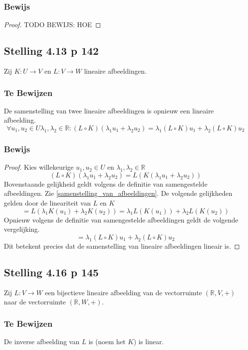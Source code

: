 \documentclass[lineaire_algebra_oplossingen.tex]{subfiles}
\begin{document}
\subsubsection*{Bewijs}
\begin{proof}
TODO BEWIJS: HOE
\end{proof}

\subsection{Stelling 4.13 p 142}
Zij $K:U\rightarrow V$ en $L:V\rightarrow W$ lineaire afbeeldingen.
\subsubsection*{Te Bewijzen}
De samenstelling van twee lineaire afbeeldingen is opnieuw een lineaire afbeelding.
\[
\forall u_1,u_2\in U \lambda_1,\lambda_2\in\mathbb{R}: (L\circ K)(\lambda_1u_1 + \lambda_2u_2) = \lambda_1(L\circ K)u_1 + \lambda_2(L\circ K)u_2
\]
\subsubsection*{Bewijs}
\begin{proof}
Kies willekeurige $u_1,u_2\in U$ en $\lambda_1,\lambda_2\in\mathbb{R}$
\[
(L\circ K)(\lambda_1u_1 + \lambda_2u_2) = L(K(\lambda_1u_1 + \lambda_2u_2))
\]
Bovenstaande gelijkheid geldt volgens de definitie van samengestelde afbeeldingen. Zie \ref{samenstelling_van_afbeeldingen}. De volgende gelijkheden gelden door de lineariteit van $L$ en $K$
\[
= L(\lambda_1K(u_1) + \lambda_2K(u_2)) = \lambda_1L(K(u_1)) + \lambda_2L(K(u_2))
\]
Opnieuw volgens de definitie van samengestelde afbeeldingen geldt de volgende vergelijking.
\[
= \lambda_1(L\circ K)u_1 + \lambda_2(L\circ K)u_2
\]
Dit betekent precies dat de samenstelling van lineaire afbeeldingen lineair is.
\end{proof}

\subsection{Stelling 4.16 p 145}
Zij $L:V\rightarrow W$ een bijectieve lineaire afbeelding van de vectorruimte $(\mathbb{R},V,+)$ naar de vectorruimte $(\mathbb{R},W,+)$.
\subsubsection*{Te Bewijzen}
De inverse afbeelding van $L$ is (noem het $K$) is linear.
\end{document}
